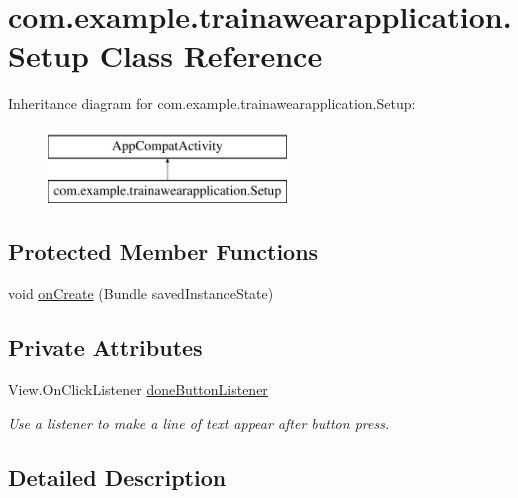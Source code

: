 \hypertarget{classcom_1_1example_1_1trainawearapplication_1_1_setup}{}\section{com.\+example.\+trainawearapplication.\+Setup Class Reference}
\label{classcom_1_1example_1_1trainawearapplication_1_1_setup}
Inheritance diagram for com.\+example.\+trainawearapplication.\+Setup\+:\begin{figure}[H]
\begin{center}
\leavevmode
\includegraphics[height=2.000000cm]{classcom_1_1example_1_1trainawearapplication_1_1_setup}
\end{center}
\end{figure}
\subsection*{Protected Member Functions}
\begin{DoxyCompactItemize}
\item 
void \mbox{\hyperlink{classcom_1_1example_1_1trainawearapplication_1_1_setup_a52f522c34d14c93dbf7f75ff75ce606d}{on\+Create}} (Bundle saved\+Instance\+State)
\end{DoxyCompactItemize}
\subsection*{Private Attributes}
\begin{DoxyCompactItemize}
\item 
View.\+On\+Click\+Listener \mbox{\hyperlink{classcom_1_1example_1_1trainawearapplication_1_1_setup_a6e717a2baaf80c283f516c044ae98e6c}{done\+Button\+Listener}}
\begin{DoxyCompactList}\small\item\em Use a listener to make a line of text appear after button press. \end{DoxyCompactList}\end{DoxyCompactItemize}


\subsection{Detailed Description}
